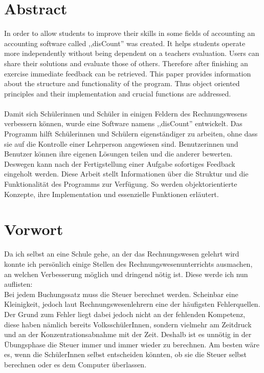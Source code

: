 \documentclass[12pt]{report}
\begin{document}
  
\section*{Abstract}

In order to allow students to improve their skills in some fields of accounting an accounting software called ,,disCount'' was created. It helps students operate more independently without being dependent on a teachers evaluation. Users can share their solutions and evaluate those of others.
Therefore after finishing an exercise immediate feedback can be retrieved. This paper provides information about the structure and functionality of the program. Thus object oriented principles and their implementation and crucial functions are addressed.\\\\

\noindent Damit sich Schülerinnen und Schüler in einigen Feldern des Rechnungswesens verbessern können, wurde eine Software namens ,,disCount'' entwickelt. Das Programm hilft Schülerinnen und Schülern eigenständiger zu arbeiten, ohne dass sie auf die Kontrolle einer Lehrperson angewiesen sind. Benutzerinnen und Benutzer können ihre eigenen Lösungen teilen und die anderer bewerten. Deswegen kann nach der Fertigstellung einer Aufgabe sofortiges Feedback eingeholt werden. Diese Arbeit stellt Informationen über die Struktur und die Funktionalität des Programms zur Verfügung. So werden objektorientierte Konzepte, ihre Implementation und essenzielle Funktionen erläutert.

\newpage
  
\section*{Vorwort} 
  
Da ich selbst an eine Schule gehe, an der das Rechnungswesen gelehrt wird konnte ich persönlich einige Stellen des Rechnungswesenunterrichts ausmachen, an welchen Verbesserung möglich und dringend nötig ist. Diese werde ich nun auflisten:\\

\noindent Bei jedem Buchungssatz muss die Steuer berechnet werden. Scheinbar eine Kleinigkeit, jedoch laut Rechnungswesenlehrern eine der häufigsten Fehlerquellen. Der Grund zum Fehler liegt dabei jedoch nicht an der fehlenden Kompetenz, diese haben nämlich bereits VolksschülerInnen, sondern vielmehr am Zeitdruck und an der Konzentrationsabnahme mit der Zeit. Deshalb ist es unnötig in der Übungsphase die Steuer immer und immer wieder zu berechnen. Am besten wäre es, wenn die SchülerInnen selbst entscheiden könnten, ob sie die Steuer selbst berechnen oder es dem Computer überlassen.\\
\end{document}
